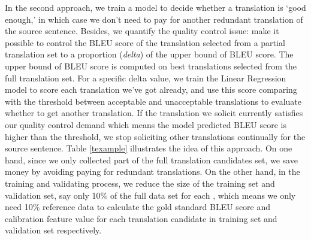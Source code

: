 \documentclass[11pt]{article}
\begin{document}
 In the second approach,  we train a model to decide whether a translation  is `good enough,' in which case we don't need to  pay for another redundant translation of the source sentence. Besides, we quantify the quality control  issue: make it possible to control the BLEU score of the translation selected from a partial translation set to a proportion (\textit{delta}) of the upper bound of BLEU score. The upper bound of BLEU score is computed on best translations selected from  the full translation set. For a specific delta value, we train the Linear Regression model to score each translation we've got already, and use this score comparing with the threshold between acceptable and unacceptable translations to evaluate whether to get another translation. If the translation we solicit currently satisfies our quality control demand which means the model predicted BLEU score is higher than the threshold, we stop soliciting other translations continually for the source sentence. Table \ref{texample} illustrates the idea of this approach. On one hand, since we only collected part of the full translation candidates set, we save money by avoiding paying for  redundant   translations.  On the other hand, in the training and validating process, we reduce the size of the training set and validation set, say only 10\% of the full data set for each , which means we only need 10\% reference data to calculate the gold standard BLEU score and calibration feature value for each translation candidate in training set and validation set respectively. 
 
\end{document}
